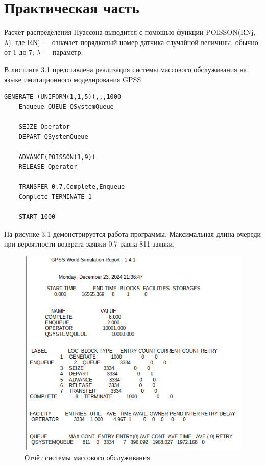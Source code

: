 \section{Практическая часть}

Расчет распределения Пуассона выводится с помощью функции POISSON(RNj, $\lambda$), где RNj --- означает  порядковый номер датчика случайной величины, обычно от 1 до 7; $\lambda$ --- параметр.

В листинге 3.1 представлена реализация системы массового обслуживания на языке имитационного моделирования GPSS.

\begin{lstlisting}[caption=Реализация системы массового обслуживания]
	GENERATE (UNIFORM(1,1,5)),,,1000
	Enqueue QUEUE QSystemQueue
	
	SEIZE Operator
	DEPART QSystemQueue
	
	ADVANCE(POISSON(1,9))
	RELEASE Operator
	
	TRANSFER 0.7,Complete,Enqueue 
	Complete TERMINATE 1
	
	START 1000
\end{lstlisting}

\clearpage

На рисунке 3.1 демонстрируется работа программы. Максимальная длина очереди при вероятности возврата заявки 0.7 равна 811 заявки.

\begin{figure}[h]
	\centering
	\includegraphics[height=0.55\textheight]{../img/res.png}
	\caption{Отчёт системы массового обслуживания}
	\label{plt:even_comp_alg}
\end{figure}


